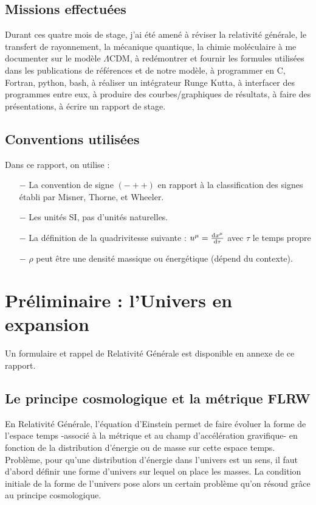 \documentclass[10pt, a4paper]{report}
\numberwithin{equation}{subsection}
\begin{document}
\section*{Missions effectuées}

Durant ces quatre mois de stage, j'ai été amené à réviser la relativité générale, le transfert de rayonnement, la mécanique quantique, la chimie moléculaire à me documenter sur le modèle $\Lambda$CDM, à redémontrer et fournir les formules utilisées dans les publications de références et de notre modèle, à programmer en C, Fortran, python, bash, à réaliser un intégrateur Runge Kutta, à interfacer des programmes entre eux, à produire des courbes/graphiques de résultats, à faire des présentations, à écrire un rapport de stage.



\section*{Conventions utilisées}

Dans ce rapport, on utilise :
\begin{itemize}
	\item[$-$] La convention de signe $(-++)$ en rapport à la classification des signes établi par Misner, Thorne, et Wheeler.
	\item[$-$] Les unités SI, pas d'unités naturelles.
	\item[$-$] La définition de la quadrivitesse suivante : $u^\mu = \frac{{\rm d}x^\mu}{{\rm d}\tau}$ avec $\tau$ le temps propre
	\item[$-$] $\rho$ peut être une densité massique ou énergétique (dépend du contexte).
\end{itemize}



\chapter{Préliminaire : l'Univers en expansion}
Un formulaire et rappel de Relativité Générale est disponible en annexe de ce rapport. 

\section{Le principe cosmologique et la métrique FLRW}
En Relativité Générale, l'équation d'Einstein permet de faire évoluer la forme de l'espace temps -associé à la métrique et au champ d'accélération gravifique- en fonction de la distribution d'énergie ou de masse sur cette espace temps. Problème, pour qu'une distribution d'énergie dans l'univers est un sens, il faut d'abord définir une forme d'univers sur lequel on place les masses. La condition initiale de la forme de l'univers pose alors un certain problème qu'on résoud grâce au principe cosmologique.
\end{document}
